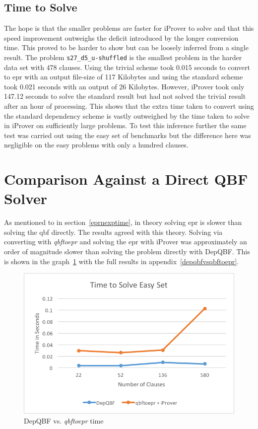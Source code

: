 \subsection{Time to Solve} \label{tvsstdsolve}
The hope is that the smaller problems are faster for iProver to solve and that this speed improvement outweighs the deficit introduced by the longer conversion time. This proved to be harder to show but can be loosely inferred from a single result. The problem \texttt{s27\_d5\_u-shuffled} is the smallest problem in the harder data set with 478 clauses. Using the trivial scheme took 0.015 seconds to convert to \gls{epr} with an output file-size of 117 Kilobytes and using the standard scheme took 0.021 seconds with an output of 26 Kilobytes. However, iProver took only 147.12 seconds to solve the standard result but had not solved the trivial result after an hour of processing. This shows that the extra time taken to convert using the standard dependency scheme is vastly outweighed by the time taken to solve in iProver on sufficiently large problems. To test this inference further the same test was carried out using the easy set of benchmarks but the difference here was negligible on the easy problems with only a hundred clauses.

\section{Comparison Against a Direct QBF Solver}
As mentioned to in section~\ref{eprnexptime}, in theory solving \gls{epr} is slower than solving the \gls{qbf} directly. The results agreed with this theory. Solving via converting with \textit{qbftoepr} and solving the \gls{epr} with iProver was approximately an order of magnitude slower than solving the problem directly with DepQBF. This is shown in the graph~\ref{depqbfvsqbftoeprgraph} with the full results in appendix~\ref{depqbfvsqbftoepr}.

\begin{figure}[h]
\caption{DepQBF vs. \textit{qbftoepr} time}
\label{depqbfvsqbftoeprgraph}
\begin{CenteredBox}
\includegraphics{png/depqbfvsqbftoepr.png}
\end{CenteredBox}
\end{figure}

